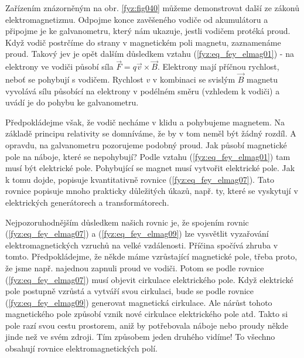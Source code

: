     Zařízením znázorněným na obr. \ref{fyz:fig040} můžeme demonstrovat další ze zákonů   
    elektromagnetizmu. Odpojme konce zavěšeného vodiče od akumulátoru a připojme je ke 
    galvanometru, který nám ukazuje, jestli vodičem protéká proud. Když vodič postrčíme do strany v 
    magnetickém poli magnetu, zaznamenáme proud. Takový jev je opět dalším důsledkem vztahu 
    (\ref{fyz:eq_fey_elmag01}) - na elektrony ve vodiči působí síla \(\vec{F}=q\vec{v} 
    \times\vec{B}\). Elektrony mají příčnou rychlost, neboť se pohybují s vodičem. Rychlost \(v\) v 
    kombinaci se svislým \(\vec{B}\) magnetu vyvolává sílu působící na elektrony v podélném směru 
    (vzhledem k vodiči) a uvádí je do pohybu ke galvanometru.      

    Předpokládejme však, že vodič necháme v klidu a pohybujeme magnetem. Na základě principu 
    relativity se domníváme, že by v tom neměl být žádný rozdíl. A opravdu, na galvanometru 
    pozorujeme podobný proud. Jak působí magnetické pole na náboje, které se nepohybují? Podle 
    vztahu (\ref{fyz:eq_fey_elmag01}) tam musí být elektrické pole. Pohybující se magnet musí 
    vytvořit elektrické pole. Jak k tomu dojde, popisuje kvantitativně rovnice 
    (\ref{fyz:eq_fey_elmag07}). Tato rovnice popisuje mnoho prakticky důležitých úkazů, např. ty, 
    které se vyskytují v elektrických generátorech a transformátorech.
    
    Nejpozoruhodnějším důsledkem našich rovnic je, že spojením rovnic (\ref{fyz:eq_fey_elmag07}) a
    (\ref{fyz:eq_fey_elmag09}) lze vysvětlit vyzařování elektromagnetických vzruchů na velké 
    vzdálenosti. Příčina spočívá zhruba v tomto. Předpokládejme, že někde máme vzrůstající 
    magnetické pole, třeba proto, že jsme např. najednou zapnuli proud ve vodiči. Potom se podle 
    rovnice (\ref{fyz:eq_fey_elmag07}) musí objevit cirkulace elektrického pole. Když elektrické 
    pole postupně vzrůstá a vytváří svou cirkulaci, bude se podle rovnice 
    (\ref{fyz:eq_fey_elmag09}) generovat magnetická cirkulace. Ale nárůst tohoto magnetického pole 
    způsobí vznik nové cirkulace elektrického pole atd. Takto si pole razí svou cestu prostorem, 
    aniž by potřebovala náboje nebo proudy někde jinde než ve svém zdroji. Tím způsobem jeden 
    druhého vidíme! To všechno obsahují rovnice elektromagnetických polí.
       
   
